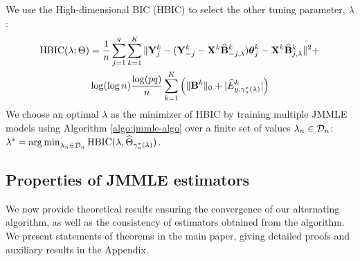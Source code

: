 We use the High-dimensional BIC (HBIC) to select the other tuning parameter, $\lambda$:
%
\begin{align*}
\text{HBIC} (\lambda; \Theta) &=
\frac{1}{n} \sum_{j=1}^q \sum_{k=1}^K \| {\mathbf{Y}}^k_j - ({\mathbf{Y}}_{-j}^k - {\mathbf{X}}^k \widehat {{\mathbf{B}}}_{-j,\lambda}^k ) {\boldsymbol{\theta}}_j^{k } - {\mathbf{X}}^k \widehat {{\mathbf{B}}}_{j,\lambda}^k \|^2 +\\
& \log (\log n) \frac{\log (pq)}{n} \sum_{k=1}^K
\left( \| {\mathbf{B}}^k \|_0 + | \widehat E_{y, \gamma_n^* (\lambda)}^k| \right)
\end{align*}
%
We choose an optimal $\lambda$ as the minimizer of HBIC by training multiple JMMLE models using Algorithm \ref{algo:jmmle-algo} over a finite set of values $\lambda_n \in {\cal{D}}_n$: 
$
\lambda^* = \operatorname*{arg\,min}_{\lambda_n \in {\cal{D}}_n} \text{HBIC} (\lambda, \widehat \Theta_{\gamma_n^*(\lambda)})
$.

%
%
%

%

\subsection{Properties of JMMLE estimators}
\label{sec:jmmle-theory}
We now provide theoretical results ensuring the convergence of our alternating algorithm, as well as the consistency of estimators obtained from the algorithm. We present statements of theorems in the main paper, giving detailed proofs and auxiliary results in the Appendix.

